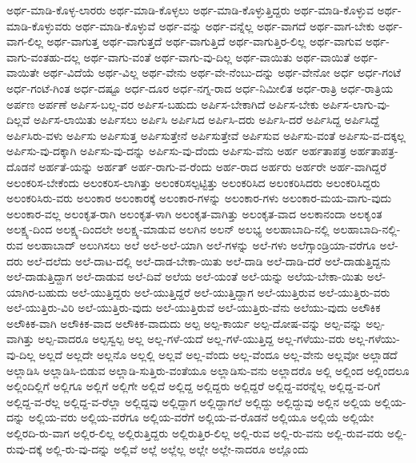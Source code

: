 {ಅರ್ಥ-ಮಾಡಿ-ಕೊಳ್ಳ-ಲಾರರು
ಅರ್ಥ-ಮಾಡಿ-ಕೊಳ್ಳಲು
ಅರ್ಥ-ಮಾಡಿ-ಕೊಳ್ಳುತ್ತಿದ್ದರು
ಅರ್ಥ-ಮಾಡಿ-ಕೊಳ್ಳುವ
ಅರ್ಥ-ಮಾಡಿ-ಕೊಳ್ಳುವರು
ಅರ್ಥ-ಮಾಡಿ-ಕೊಳ್ಳುವೆ
ಅರ್ಥ-ವನ್ನು
ಅರ್ಥ-ವನ್ನೆಲ್ಲ
ಅರ್ಥ-ವಾಗದೆ
ಅರ್ಥ-ವಾಗ-ಬೇಕು
ಅರ್ಥ-ವಾಗ-ಲಿಲ್ಲ
ಅರ್ಥ-ವಾಗುತ್ತ
ಅರ್ಥ-ವಾಗುತ್ತದೆ
ಅರ್ಥ-ವಾಗುತ್ತಿದೆ
ಅರ್ಥ-ವಾಗುತ್ತಿರ-ಲಿಲ್ಲ
ಅರ್ಥ-ವಾಗುವ
ಅರ್ಥ-ವಾಗು-ವಂತಹು-ದಲ್ಲ
ಅರ್ಥ-ವಾಗು-ವಂತೆ
ಅರ್ಥ-ವಾಗು-ವು-ದಿಲ್ಲ
ಅರ್ಥ-ವಾಯಿತು
ಅರ್ಥ-ವಾಯಿತೆ
ಅರ್ಥ-ವಾಯಿತೇ
ಅರ್ಥ-ವಿದೆಯೆ
ಅರ್ಥ-ವಿಲ್ಲ
ಅರ್ಥ-ವೇನು
ಅರ್ಥ-ವೇ-ನೆಂಬು-ದನ್ನು
ಅರ್ಥ-ವೇನೋ
ಅರ್ಧ
ಅರ್ಧ-ಗಂಟೆ
ಅರ್ಧ-ಗಂಟೆ-ಗಿಂತ
ಅರ್ಧ-ದಷ್ಟೂ
ಅರ್ಧ-ದೂರ
ಅರ್ಧ-ನಗ್ನ-ರಾದ
ಅರ್ಧ-ನಿಮೀಲಿತ
ಅರ್ಧ-ರಾತ್ರಿ
ಅರ್ಧ-ರಾತ್ರಿಯ
ಅರ್ಪಣ
ಅರ್ಪಣೆ
ಅರ್ಪಿಸ-ಬಲ್ಲ-ವರ
ಅರ್ಪಿಸ-ಬಹುದು
ಅರ್ಪಿಸ-ಬೇಕಾಗಿದೆ
ಅರ್ಪಿಸ-ಬೇಕು
ಅರ್ಪಿಸ-ಲಾಗು-ವು-ದಿಲ್ಲವೆ
ಅರ್ಪಿಸ-ಲಾಯಿತು
ಅರ್ಪಿಸಲು
ಅರ್ಪಿಸಿ
ಅರ್ಪಿಸಿದ
ಅರ್ಪಿಸಿ-ದರು
ಅರ್ಪಿಸಿ-ದರೆ
ಅರ್ಪಿಸಿದ್ದ
ಅರ್ಪಿಸಿದ್ದೆ
ಅರ್ಪಿಸಿರು-ವಳು
ಅರ್ಪಿಸು
ಅರ್ಪಿಸುತ್ತ
ಅರ್ಪಿಸುತ್ತೇನೆ
ಅರ್ಪಿಸುತ್ತೇವೆ
ಅರ್ಪಿಸುವ
ಅರ್ಪಿಸು-ವಂತೆ
ಅರ್ಪಿಸು-ವ-ದಕ್ಕಲ್ಲ
ಅರ್ಪಿಸು-ವು-ದಕ್ಕಾಗಿ
ಅರ್ಪಿಸು-ವು-ದನ್ನು
ಅರ್ಪಿಸು-ವು-ದೆಂದು
ಅರ್ಪಿಸು-ವೆನು
ಅರ್ಹ
ಅರ್ಹತಾಪತ್ರ
ಅರ್ಹತಾಪತ್ರ-ದೊಡನೆ
ಅರ್ಹತೆ-ಯನ್ನು
ಅರ್ಹತ್
ಅರ್ಹ-ರಾಗು-ವ-ರೆಂದು
ಅರ್ಹ-ರಾದ
ಅರ್ಹರು
ಅರ್ಹರೇ
ಅರ್ಹ-ವಾಗಿದ್ದರೆ
ಅಲಂಕರಿಸ-ಬೇಕೆಂದು
ಅಲಂಕರಿಸ-ಲಾಗಿತ್ತು
ಅಲಂಕರಿಸಲ್ಪಟ್ಟಿತ್ತು
ಅಲಂಕರಿಸಿದ
ಅಲಂಕರಿಸಿದರು
ಅಲಂಕರಿಸಿದ್ದರು
ಅಲಂಕರಿಸಿರು-ವರು
ಅಲಂಕಾರ
ಅಲಂಕಾರಕ್ಕೆ
ಅಲಂಕಾರ-ಗಳನ್ನು
ಅಲಂಕಾರ-ಗಳು
ಅಲಂಕಾರ-ಮಯ-ವಾಗು-ವುದು
ಅಲಂಕಾರ-ವಲ್ಲ
ಅಲಂಕೃತ-ರಾಗಿ
ಅಲಂಕೃತ-ಳಾಗಿ
ಅಲಂಕೃತ-ವಾಗಿತ್ತು
ಅಲಂಕೃತ-ವಾದ
ಅಲಕಾನಂದಾ
ಅಲಕೃಂತ
ಅಲಕ್ಷ್ಯ-ದಿಂದ
ಅಲಕ್ಷ್ಯ-ದಿಂದಲೇ
ಅಲಕ್ಷ್ಯ-ಮಾಡುವ
ಅಲಗಿನ
ಅಲನ್
ಅಲಭ್ಯ
ಅಲಹಾಬಾದಿ-ನಲ್ಲಿ
ಅಲಹಾಬಾದಿ-ನಲ್ಲಿ-ರುವ
ಅಲಹಾಬಾದ್
ಅಲುಗಿಸಲು
ಅಲೆ
ಅಲೆ-ಅಲೆ-ಯಾಗಿ
ಅಲೆ-ಗಳನ್ನು
ಅಲೆ-ಗಳು
ಅಲೆಗ್ಸಾಂಡ್ರಿಯಾ-ವರೆಗೂ
ಅಲೆ-ದರು
ಅಲೆ-ದಲೆದು
ಅಲೆ-ದಾಟ-ದಲ್ಲಿ
ಅಲೆ-ದಾಡ-ಬೇಕಾ-ಯಿತು
ಅಲೆ-ದಾಡಿ
ಅಲೆ-ದಾಡಿ-ದರೆ
ಅಲೆ-ದಾಡುತ್ತಿದ್ದನು
ಅಲೆ-ದಾಡುತ್ತಿದ್ದಾಗ
ಅಲೆ-ದಾಡುವ
ಅಲೆ-ದಿವೆ
ಅಲೆಯ
ಅಲೆ-ಯಂತೆ
ಅಲೆ-ಯನ್ನು
ಅಲೆಯ-ಬೇಕಾ-ಯಿತು
ಅಲೆ-ಯಾಗಿರ-ಬಹುದು
ಅಲೆ-ಯುತ್ತಿದ್ದರು
ಅಲೆ-ಯುತ್ತಿದ್ದರೆ
ಅಲೆ-ಯುತ್ತಿದ್ದಾಗ
ಅಲೆ-ಯುತ್ತಿರುವ
ಅಲೆ-ಯುತ್ತಿರು-ವರು
ಅಲೆ-ಯುತ್ತಿರು-ವಿರಿ
ಅಲೆ-ಯುತ್ತಿರು-ವುದು
ಅಲೆ-ಯುತ್ತಿರುವೆ
ಅಲೆ-ಯುತ್ತಿರು-ವೆನು
ಅಲೆಯು-ವುದು
ಅಲೌಕಿಕ
ಅಲೌಕಿಕ-ವಾಗಿ
ಅಲೌಕಿಕ-ವಾದ
ಅಲೌಕಿಕ-ವಾದುದು
ಅಲ್ಪ
ಅಲ್ಪ-ಕಾರ್ಯ
ಅಲ್ಪ-ದೋಷ-ವನ್ನು
ಅಲ್ಪ-ವನ್ನು
ಅಲ್ಪ-ವಾಗಿತ್ತು
ಅಲ್ಪ-ವಾದರೂ
ಅಲ್ಪಸ್ವಲ್ಪ
ಅಲ್ಲ
ಅಲ್ಲ-ಗಳೆ-ಯದೆ
ಅಲ್ಲ-ಗಳೆ-ಯುತ್ತಿದ್ದ
ಅಲ್ಲ-ಗಳೆಯು-ವರು
ಅಲ್ಲ-ಗಳೆಯು-ವು-ದಿಲ್ಲ
ಅಲ್ಲದೆ
ಅಲ್ಲದೇ
ಅಲ್ಲನೊ
ಅಲ್ಲಲ್ಲಿ
ಅಲ್ಲವೆ
ಅಲ್ಲ-ವೆಂದು
ಅಲ್ಲ-ವೆಂದೂ
ಅಲ್ಲ-ವೇನು
ಅಲ್ಲವೋ
ಅಲ್ಲಾಡದೆ
ಅಲ್ಲಾಡಿಸಿ
ಅಲ್ಲಾಡಿಸಿ-ಬಿಡುವ
ಅಲ್ಲಾಡಿ-ಸುತ್ತಿರು-ವಂತೆಯೂ
ಅಲ್ಲಾಡಿಸು-ವನು
ಅಲ್ಲಾದರೊ
ಅಲ್ಲಿ
ಅಲ್ಲಿಂದ
ಅಲ್ಲಿಂದಲೂ
ಅಲ್ಲಿಂದಿಲ್ಲಿಗೆ
ಅಲ್ಲಿಗೂ
ಅಲ್ಲಿಗೆ
ಅಲ್ಲಿಗೇ
ಅಲ್ಲಿದೆ
ಅಲ್ಲಿದ್ದ
ಅಲ್ಲಿದ್ದರು
ಅಲ್ಲಿದ್ದರೆ
ಅಲ್ಲಿದ್ದ-ವರನ್ನೆಲ್ಲ
ಅಲ್ಲಿದ್ದ-ವ-ರಿಗೆ
ಅಲ್ಲಿದ್ದ-ವ-ರೆಲ್ಲ
ಅಲ್ಲಿದ್ದ-ವ-ರೆಲ್ಲಾ
ಅಲ್ಲಿದ್ದವು
ಅಲ್ಲಿದ್ದಾಗ
ಅಲ್ಲಿದ್ದಾಗಲೆ
ಅಲ್ಲಿದ್ದು
ಅಲ್ಲಿದ್ದುವು
ಅಲ್ಲಿನ
ಅಲ್ಲಿಯ
ಅಲ್ಲಿಯ-ದನ್ನು
ಅಲ್ಲಿಯ-ವರು
ಅಲ್ಲಿಯ-ವರೆಗೂ
ಅಲ್ಲಿಯ-ವರೆಗೆ
ಅಲ್ಲಿಯ-ವ-ರೊಡನೆ
ಅಲ್ಲಿಯೂ
ಅಲ್ಲಿಯೆ
ಅಲ್ಲಿಯೇ
ಅಲ್ಲಿರದಿ-ರು-ವಾಗ
ಅಲ್ಲಿರ-ಲಿಲ್ಲ
ಅಲ್ಲಿರುತ್ತಿದ್ದರು
ಅಲ್ಲಿರುತ್ತಿರ-ಲಿಲ್ಲ
ಅಲ್ಲಿ-ರುವ
ಅಲ್ಲಿ-ರು-ವನು
ಅಲ್ಲಿ-ರುವ-ವರು
ಅಲ್ಲಿ-ರುವು-ದಕ್ಕೆ
ಅಲ್ಲಿ-ರು-ವು-ದನ್ನು
ಅಲ್ಲಿವೆ
ಅಲ್ಲೆ
ಅಲ್ಲೆಲ್ಲ
ಅಲ್ಲೇ
ಅಲ್ಲೇ-ನಾದರೂ
ಅಲ್ಲೊಂದು
}
